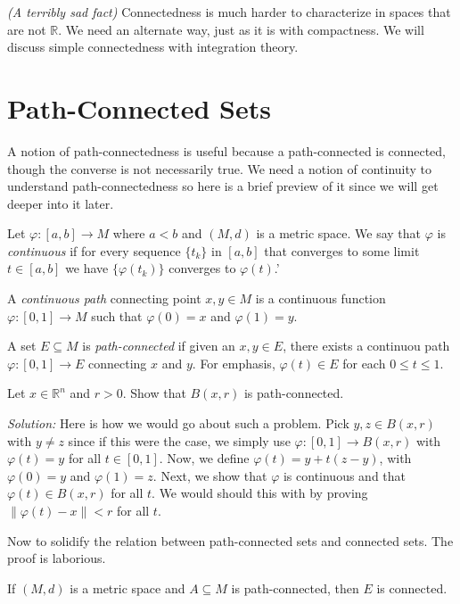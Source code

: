 \documentclass[11pt]{article}
\theoremstyle{definition}
\newcommand{\R}{\mathbb{R}}                      %
\begin{document}
 \note \textit{(A terribly sad fact)} Connectedness is much harder to characterize in spaces that are not $\R$. We need an alternate way, just as it is with compactness. We will discuss simple connectedness with integration theory.

 \section{Path-Connected Sets}
A notion of path-connectedness is useful because a path-connected is connected, though the converse is not necessarily true. We need a notion of continuity to understand path-connectedness so here is a brief preview of it since we will get deeper into it later.

\begin{mdframed}[backgroundcolor = blue!10]
\vspace{+0.2cm}
     Let $\varphi:[a,b]\to M$ where $a<b$ and $(M,d)$ is a metric space. We say that $\varphi$ is \textit{continuous} if for every sequence $\{t_k\}$ in $[a,b]$ that converges to some limit $t\in[a,b]$ we have $\{\varphi(t_k)\}$ converges to $\varphi(t)$.'

    A \textit{continuous path} connecting point $x,y\in M$ is a continuous function $\varphi:[0,1]\to M$ such that $\varphi(0)=x$ and $\varphi(1)=y$.

    A set $E\subseteq M$ is \textit{path-connected} if given an $x,y\in E$, there exists a continuou path $\varphi:[0,1]\to E$ connecting $x$ and $y$.
    \note For emphasis, $\varphi(t)\in E$ for each $0\leq t\leq 1$.
\end{mdframed}

\ex Let $x\in \R^n$ and $r>0$. Show that $B(x,r)$ is path-connected.

\textit{Solution:} Here is how we would go about such a problem. Pick $y,z\in B(x,r)$ with $y\neq z$ since if this were the case, we simply use $\varphi:[0,1]\to B(x,r)$ with $\varphi(t)=y$ for all $t\in[0,1]$. Now, we define $\varphi(t)=y+t(z-y)$, with $\varphi(0)=y$ and $\varphi(1)=z$. Next, we show that $\varphi$ is continuous and that $\varphi(t)\in B(x,r)$ for all $t$. We would should this with  by proving $\|\varphi(t)-x\|<r$ for all $t$.

Now to solidify the relation between path-connected sets and connected sets. The proof is laborious.

\prop If $(M,d)$ is a metric space and $A\subseteq M$ is path-connected, then $E$ is connected.
\end{document}

